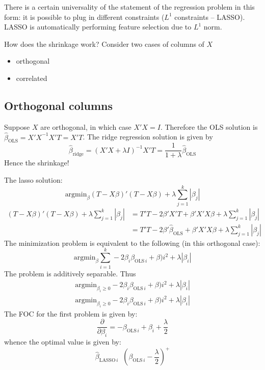 \documentclass[a4paper]{article}
\newcommand{\brac}[1]{{\left ( #1 \right )}}
\newcommand{\abs}[1]{{\left | #1 \right |}}
\newcommand{\defn}{\mathop{\overset{\Delta}{=}}\nolimits}
\begin{document}
There is a certain universality of the statement of the regression problem in this form:
it is possible to plug in different constraints ($L^1$ constraints -- LASSO).
LASSO is automatically performing feature selection due to $L^1$ norm.


How does the shrinkage work?
Consider two cases of columns of $X$ \begin{itemize}
	\item orthogonal
	\item correlated
\end{itemize}

\subsection*{Orthogonal columns} %
\label{sub:orthogonal_columns}

Suppose $X$ are orthogonal, in which case $X'X = I$. Therefore
the OLS solution is $\hat{\beta}_{\text{OLS}} = {X'X}^{-1}X'T = X'T$.
The ridge regression solution is given by 
\[\hat{\beta}_{\text{ridge}} = \brac{X'X + \lambda I}^{-1} X'T = \frac{1}{1+\lambda} \hat{\beta}_{\text{OLS}}\]
Hence the shrinkage!

The lasso solution:
\[\text{argmin}_\beta \brac{T - X\beta}'\brac{T - X\beta} + \lambda \sum_{j=1}^k \abs{\beta_j}\]
\begin{align*}
	\brac{T - X\beta}'\brac{T - X\beta} + \lambda \sum_{j=1}^k \abs{\beta_j}
	& = T'T - 2 \beta'X'T + \beta'X'X\beta + \lambda \sum_{j=1}^k \abs{\beta_j}\\
	& = T'T - 2 \beta'\hat{\beta}_{\text{OLS}} + \beta'X'X\beta + \lambda \sum_{j=1}^k \abs{\beta_j}
\end{align*}
The minimization problem is equivalent to the following (in this orthogonal case):
\[\text{argmin}_\beta \sum_{i=1}^k -2 \beta_i \beta_{\text{OLS}\,i}+ \beta)i^2 + \lambda \abs{\beta_i}\]
The problem is additively separable. Thus \begin{align*}
	\text{argmin}_{\beta_i\geq 0} -2 \beta_i \beta_{\text{OLS}\,i}+ \beta)i^2 + \lambda \abs{\beta_i}\\
	\text{argmin}_{\beta_i\geq 0} -2 \beta_i \beta_{\text{OLS}\,i}+ \beta)i^2 + \lambda \abs{\beta_i}
\end{align*}
The FOC for the first problem is given by:
\[\frac{\partial}{\partial \beta_i} = - \beta_{\text{OLS}\,i} + \beta_i + \frac{\lambda}{2}\]
whence the optimal value is given by:
\[\hat{\beta}_{\text{LASSO}\,i} \defn \brac{ \beta_{\text{OLS}\,i} - \frac{\lambda}{2} }^+\]
\end{document}
